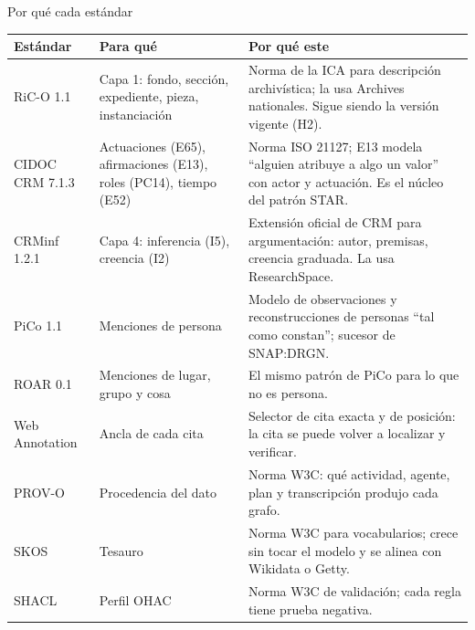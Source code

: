 \documentclass[aspectratio=169,10pt]{beamer}
\begin{document}
\begin{frame}{Por qué cada estándar}
\scriptsize
\begin{tabular}{@{}p{2.4cm}p{3.2cm}p{7.6cm}@{}}
\toprule
Estándar & Para qué & Por qué este \\
\midrule
RiC-O 1.1 & Capa 1: fondo, sección, expediente, pieza, instanciación & Norma de la ICA para descripción archivística; la usa Archives nationales. Sigue siendo la versión vigente (H2). \\
CIDOC CRM 7.1.3 & Actuaciones (E65), afirmaciones (E13), roles (PC14), tiempo (E52) & Norma ISO 21127; E13 modela \enquote{alguien atribuye a algo un valor} con actor y actuación. Es el núcleo del patrón STAR. \\
CRMinf 1.2.1 & Capa 4: inferencia (I5), creencia (I2) & Extensión oficial de CRM para argumentación: autor, premisas, creencia graduada. La usa ResearchSpace. \\
PiCo 1.1 & Menciones de persona & Modelo de observaciones y reconstrucciones de personas \enquote{tal como constan}; sucesor de SNAP:DRGN. \\
ROAR 0.1 & Menciones de lugar, grupo y cosa & El mismo patrón de PiCo para lo que no es persona. \\
Web Annotation & Ancla de cada cita & Selector de cita exacta y de posición: la cita se puede volver a localizar y verificar. \\
PROV-O & Procedencia del dato & Norma W3C: qué actividad, agente, plan y transcripción produjo cada grafo. \\
SKOS & Tesauro & Norma W3C para vocabularios; crece sin tocar el modelo y se alinea con Wikidata o Getty. \\
SHACL & Perfil OHAC & Norma W3C de validación; cada regla tiene prueba negativa. \\
\bottomrule
\end{tabular}
\end{frame}
\end{document}
